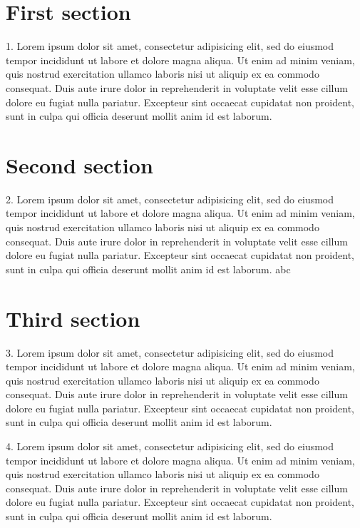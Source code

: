 \documentclass[11pt]{article}
\begin{document}
\section{First section}

1. Lorem ipsum dolor sit amet, consectetur adipisicing elit, sed do eiusmod tempor incididunt ut labore et dolore magna aliqua. Ut enim ad minim veniam, quis nostrud exercitation ullamco laboris nisi ut aliquip ex ea commodo consequat. Duis aute irure dolor in reprehenderit in voluptate velit esse cillum dolore eu fugiat nulla pariatur. Excepteur sint occaecat cupidatat non proident, sunt in culpa qui officia deserunt mollit anim id est laborum.

\section{Second section}

2. Lorem ipsum dolor sit amet, consectetur adipisicing elit, sed do eiusmod tempor incididunt ut labore et dolore magna aliqua. Ut enim ad minim veniam, quis nostrud exercitation ullamco laboris nisi ut aliquip ex ea commodo consequat. Duis aute irure dolor in reprehenderit in voluptate velit esse cillum dolore eu fugiat nulla pariatur. Excepteur sint occaecat cupidatat non proident, sunt in culpa qui officia deserunt mollit anim id est laborum.
abc
\newpage

\section{Third section}

3. Lorem ipsum dolor sit amet, consectetur adipisicing elit, sed do eiusmod tempor incididunt ut labore et dolore magna aliqua. Ut enim ad minim veniam, quis nostrud exercitation ullamco laboris nisi ut aliquip ex ea commodo consequat. Duis aute irure dolor in reprehenderit in voluptate velit esse cillum dolore eu fugiat nulla pariatur. Excepteur sint occaecat cupidatat non proident, sunt in culpa qui officia deserunt mollit anim id est laborum.

4. Lorem ipsum dolor sit amet, consectetur adipisicing elit, sed do eiusmod tempor incididunt ut labore et dolore magna aliqua. Ut enim ad minim veniam, quis nostrud exercitation ullamco laboris nisi ut aliquip ex ea commodo consequat. Duis aute irure dolor in reprehenderit in voluptate velit esse cillum dolore eu fugiat nulla pariatur. Excepteur sint occaecat cupidatat non proident, sunt in culpa qui officia deserunt mollit anim id est laborum.
\end{document}
